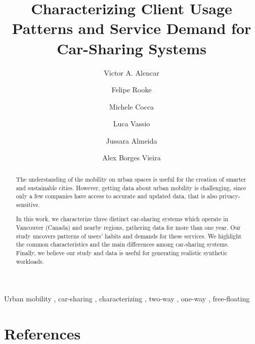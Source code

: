 \documentclass[preprint]{elsarticle}
\begin{document}
 

\begin{frontmatter}

\title{Characterizing Client Usage Patterns and Service Demand for Car-Sharing Systems}

\author[ufjf]{Victor A. Alencar}
\author[ufjf]{Felipe Rooke}
\author[polito]{Michele Cocca}
\author[polito]{Luca Vassio}
\author[ufmg]{Jussara Almeida}
\author[ufjf]{Alex Borges Vieira}


\address[ufjf]{Computer Science Department, Universidade Federal de Juiz de Fora,  Brazil}

\address[ufmg]{Computer Science Department,Universidade Federal de Minas Gerais,  Brazil}

\address[polito]{Department of Electronics and Telecommunications, Politecnico di Torino, Italy}





\begin{abstract}

The understanding of the mobility on urban spaces is useful for the creation of smarter and sustainable cities. However, getting data about urban mobility is challenging, since only a few companies have access to accurate and updated data, that is also privacy-sensitive. 

In this work, we characterize three distinct car-sharing systems which operate in Vancouver (Canada) and nearby regions, gathering data for more than one year. Our study uncovers patterns of users' habits and demands for these services. 
We highlight the common characteristics and the main differences among car-sharing systems. Finally, we believe our study and data is useful for generating realistic synthetic workloads.
\end{abstract}

\begin{keyword}

Urban mobility \sep
car-sharing \sep
characterizing \sep
two-way \sep
one-way \sep
free-floating

\end{keyword}

\end{frontmatter}     
     
\linenumbers














\section*{References}


\end{document}
